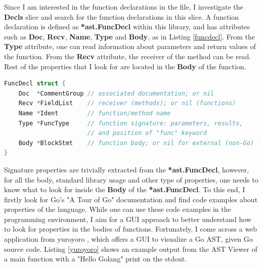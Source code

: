 \documentclass{seal_thesis}
\begin{document}
\noindent Since I am interested in the function declarations in the file, I investigate the \textbf{Decls} slice and search for the function declarations in this slice. A function declaration is defined as \textbf{*ast.FuncDecl} within this library, and has attributes such as \textbf{Doc}, \textbf{Recv}, \textbf{Name}, \textbf{Type} and \textbf{Body}, as in Listing \ref{funcdecl}. From the \textbf{Type} attribute, one can read information about parameters and return values of the function. From the \textbf{Recv} attribute, the receiver of the method can be read. Rest of the properties that I look for are located in the \textbf{Body} of the function.

\begin{lstlisting}[caption=*ast.FuncDecl declaration in Go., label={funcdecl}, language=Go, frame=single]
FuncDecl struct {
	Doc  *CommentGroup // associated documentation; or nil
	Recv *FieldList    // receiver (methods); or nil (functions)
	Name *Ident        // function/method name
	Type *FuncType     // function signature: parameters, results, 
					   // and position of "func" keyword
	Body *BlockStmt    // function body; or nil for external (non-Go) function
}
\end{lstlisting}

\noindent Signature properties are trivially extracted from the \textbf{*ast.FuncDecl}, however, for all the body, standard library usage and other type of properties, one needs to know what to look for inside the \textbf{Body} of the \textbf{*ast.FuncDecl}. To this end, I firstly look for Go's "A Tour of Go" documentation \cite{atourofgo} and find code examples about properties of the language. While one can use these code examples in the programming environment, I aim for a GUI approach to better understand how to look for properties in the bodies of functions. Fortunately, I come across a web application from yuroyoro \cite{goastviewer}, which offers a GUI to visualize a Go AST, given Go source code. Listing \ref{yuroyoro} shows an example output from the AST Viewer of a main function with a "Hello Golang" print on the stdout.
\end{document}
